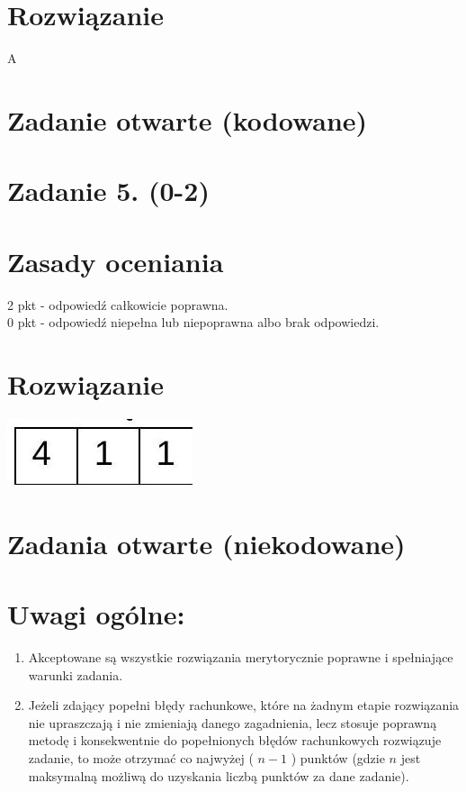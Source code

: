 \documentclass[10pt]{article}
\begin{document}
\section*{Rozwiązanie}
A

\section*{Zadanie otwarte (kodowane)}
\section*{Zadanie 5. (0-2)}
\section*{Zasady oceniania}
2 pkt - odpowiedź całkowicie poprawna.\\
0 pkt - odpowiedź niepełna lub niepoprawna albo brak odpowiedzi.

\section*{Rozwiązanie}
\begin{center}
\includegraphics[max width=\textwidth]{2025_02_07_368c3175bd12651af85ag-03}
\end{center}

\section*{Zadania otwarte (niekodowane)}
\section*{Uwagi ogólne:}
\begin{enumerate}
  \item Akceptowane są wszystkie rozwiązania merytorycznie poprawne i spełniające warunki zadania.
  \item Jeżeli zdający popełni błędy rachunkowe, które na żadnym etapie rozwiązania nie upraszczają i nie zmieniają danego zagadnienia, lecz stosuje poprawną metodę i konsekwentnie do popełnionych błędów rachunkowych rozwiązuje zadanie, to może otrzymać co najwyżej ( $n-1$ ) punktów (gdzie $n$ jest maksymalną możliwą do uzyskania liczbą punktów za dane zadanie).
\end{enumerate}
\end{document}
